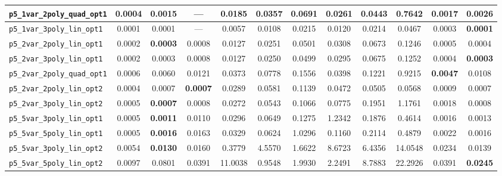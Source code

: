 \begin{landscape}
\begin{table}[H]
{\begin{tabular}{lccccccccccc}
\hline
\texttt{p5\_1var\_2poly\_quad\_opt1} & 0.0004 & \textbf{0.0015} & --- & 0.0185 & 0.0357 & 0.0691 & 0.0261 & 0.0443 & 0.7642 & 0.0017 & 0.0026 \\
\hline
\texttt{p5\_1var\_3poly\_lin\_opt1} & 0.0001 & 0.0001 & --- & 0.0057 & 0.0108 & 0.0215 & 0.0120 & 0.0214 & 0.0467 & 0.0003 & \textbf{0.0001} \\
\hline
\texttt{p5\_2var\_2poly\_lin\_opt1} & 0.0002 & \textbf{0.0003} & 0.0008 & 0.0127 & 0.0251 & 0.0501 & 0.0308 & 0.0673 & 0.1246 & 0.0005 & 0.0004 \\
\hline
\texttt{p5\_2var\_3poly\_lin\_opt1} & 0.0002 & 0.0003 & 0.0008 & 0.0127 & 0.0250 & 0.0499 & 0.0295 & 0.0675 & 0.1252 & 0.0004 & \textbf{0.0003} \\
\hline
\texttt{p5\_2var\_2poly\_quad\_opt1} & 0.0006 & 0.0060 & 0.0121 & 0.0373 & 0.0778 & 0.1556 & 0.0398 & 0.1221 & 0.9215 & \textbf{0.0047} & 0.0108 \\
\hline
\texttt{p5\_2var\_2poly\_lin\_opt2} & 0.0004 & 0.0007 & \textbf{0.0007} & 0.0289 & 0.0581 & 0.1139 & 0.0472 & 0.0505 & 0.0568 & 0.0009 & 0.0007 \\
\hline
\texttt{p5\_2var\_3poly\_lin\_opt2} & 0.0005 & \textbf{0.0007} & 0.0008 & 0.0272 & 0.0543 & 0.1066 & 0.0775 & 0.1951 & 1.1761 & 0.0018 & 0.0008 \\
\hline
\texttt{p5\_5var\_3poly\_lin\_opt1} & 0.0005 & \textbf{0.0011} & 0.0110 & 0.0296 & 0.0649 & 0.1275 & 1.2342 & 0.1876 & 0.4614 & 0.0016 & 0.0013 \\
\hline
\texttt{p5\_5var\_5poly\_lin\_opt1} & 0.0005 & \textbf{0.0016} & 0.0163 & 0.0329 & 0.0624 & 1.0296 & 0.1160 & 0.2114 & 0.4879 & 0.0022 & 0.0016 \\
\hline
\texttt{p5\_5var\_3poly\_lin\_opt2} & 0.0054 & \textbf{0.0130} & 0.0160 & 0.3779 & 4.5570 & 1.6622 & 8.6723 & 6.4356 & 14.0548 & 0.0234 & 0.0139 \\
\hline
\texttt{p5\_5var\_5poly\_lin\_opt2} & 0.0097 & 0.0801 & 0.0391 & 11.0038 & 0.9548 & 1.9930 & 2.2491 & 8.7883 & 22.2926 & 0.0391 & \textbf{0.0245} \\
\bottomrule
\end{tabular}
}%
\end{table}
\end{landscape}



